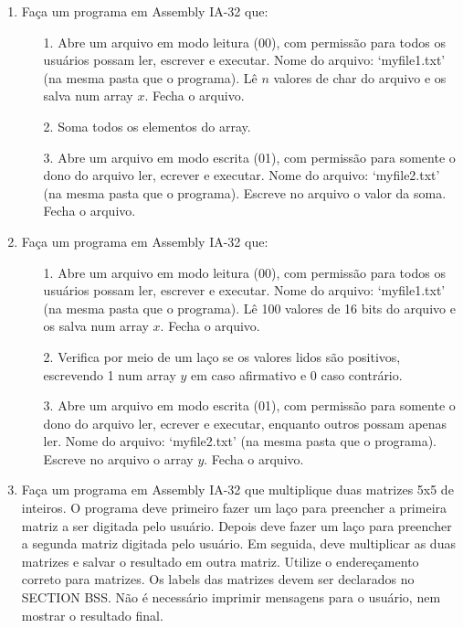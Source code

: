 \begin{enumerate}
    \item
    Faça um programa em Assembly IA-32 que:
    \begin{enumerate}
        \item [1.]
        Abre um arquivo em modo leitura (00), 
        com permissão para todos os usuários 
        possam ler, escrever e executar. 
        Nome do arquivo: `myfile1.txt' (na mesma pasta que o programa). 
        Lê $n$ valores de char do arquivo e os salva num array $x$. 
        Fecha o arquivo.

        \item [2.]
        Soma todos os elementos do array.

        \item [3.]
        Abre um arquivo em modo escrita (01), com permissão
        para somente o dono do arquivo ler, ecrever e executar. 
        Nome do arquivo: `myfile2.txt' (na mesma pasta que o programa). 
        Escreve no arquivo o valor da soma.
        Fecha o arquivo.
    \end{enumerate}

    \item
    Faça um programa em Assembly IA-32 que:
    \begin{enumerate}
        \item [1.]
        Abre um arquivo em modo leitura (00), 
        com permissão para todos os usuários 
        possam ler, escrever e executar. 
        Nome do arquivo: `myfile1.txt' (na mesma pasta que o programa). 
        Lê 100 valores de 16 bits do arquivo e os salva num array $x$. 
        Fecha o arquivo.

        \item [2.]
        Verifica por meio de um laço se os valores lidos são positivos,
        escrevendo 1 num array $y$ em caso afirmativo e 0 caso contrário.

        \item [3.]
        Abre um arquivo em modo escrita (01), com permissão
        para somente o dono do arquivo ler, ecrever e executar,
        enquanto outros possam apenas ler. 
        Nome do arquivo: `myfile2.txt' (na mesma pasta que o programa). 
        Escreve no arquivo o array $y$.
        Fecha o arquivo.
    \end{enumerate}

    \item
    Faça um programa em Assembly IA-32
    que multiplique duas matrizes 5x5 de inteiros.
    O programa deve primeiro fazer um laço 
    para preencher a primeira matriz a ser digitada pelo usuário.
    Depois deve fazer um laço 
    para preencher a segunda matriz digitada pelo usuário.
    Em seguida, deve multiplicar as duas matrizes
    e salvar o resultado em outra matriz.
    Utilize o endereçamento correto para matrizes.
    Os labels das matrizes devem ser declarados no SECTION BSS.
    Não é necessário imprimir mensagens para o usuário,
    nem mostrar o resultado final.


\end{enumerate}
